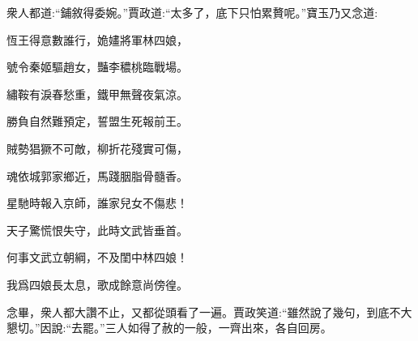 \begin{parag}
    衆人都道:“鋪敘得委婉。”賈政道:“太多了，底下只怕累贅呢。”寶玉乃又念道:
\end{parag}


\begin{poem}
    \begin{pl}恆王得意數誰行，姽嫿將軍林四娘，\end{pl}

    \begin{pl}號令秦姬驅趙女，豔李穠桃臨戰場。\end{pl}

    \begin{pl}繡鞍有淚春愁重，鐵甲無聲夜氣涼。\end{pl}

    \begin{pl}勝負自然難預定，誓盟生死報前王。\end{pl}

    \begin{pl}賊勢猖獗不可敵，柳折花殘實可傷，\end{pl}

    \begin{pl}魂依城郭家鄉近，馬踐胭脂骨髓香。\end{pl}

    \begin{pl}星馳時報入京師，誰家兒女不傷悲！\end{pl}

    \begin{pl}天子驚慌恨失守，此時文武皆垂首。\end{pl}

    \begin{pl}何事文武立朝綱，不及閨中林四娘！\end{pl}

    \begin{pl}我爲四娘長太息，歌成餘意尚傍徨。\end{pl}

\end{poem}


\begin{parag}
    念畢，衆人都大讚不止，又都從頭看了一遍。賈政笑道:“雖然說了幾句，到底不大懇切。”因說:“去罷。”三人如得了赦的一般，一齊出來，各自回房。
\end{parag}


